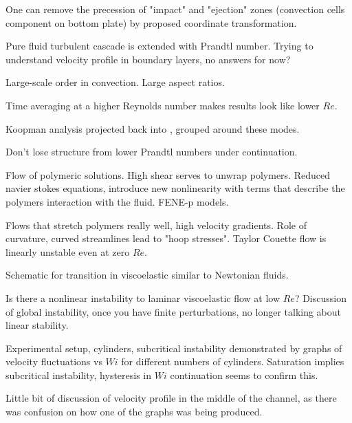 \begin{description}
{\begin{description}
One can remove the precession of "impact" and "ejection" zones (convection cells component on bottom plate) by proposed coordinate transformation.

Pure fluid turbulent cascade is extended with Prandtl number.
Trying to understand velocity profile in boundary layers, no answers for now?

Large-scale order in convection. Large aspect ratios.

Time averaging at a higher Reynolds number makes results look like lower
$Re$.

Koopman analysis projected back into {\statesp}, grouped around these modes.

Don't lose structure from lower Prandtl numbers under continuation.

\item[P. Arratia Talk]
Flow of polymeric solutions. High shear serves to unwrap polymers.
Reduced navier stokes equations, introduce new nonlinearity with terms that describe the polymers interaction with the fluid. FENE-p models.

Flows that stretch polymers really well, high velocity gradients.
Role of curvature, curved streamlines lead to "hoop stresses". Taylor
Couette flow is linearly unstable even at zero $Re$.

Schematic for transition in viscoelastic similar to Newtonian fluids.

Is there a nonlinear instability to laminar viscoelastic flow at low $Re$?
Discussion of global instability, once you have finite perturbations, no longer talking about linear stability.

Experimental setup, cylinders, subcritical instability demonstrated by
graphs of velocity fluctuations vs $Wi$ for different numbers of cylinders. Saturation implies subcritical instability, hysteresis
in $Wi$ continuation seems to confirm this.

Little bit of discussion of velocity profile in the middle of the channel, as there was confusion on how one of the graphs was being produced.
\end{description}
}

\end{description}
